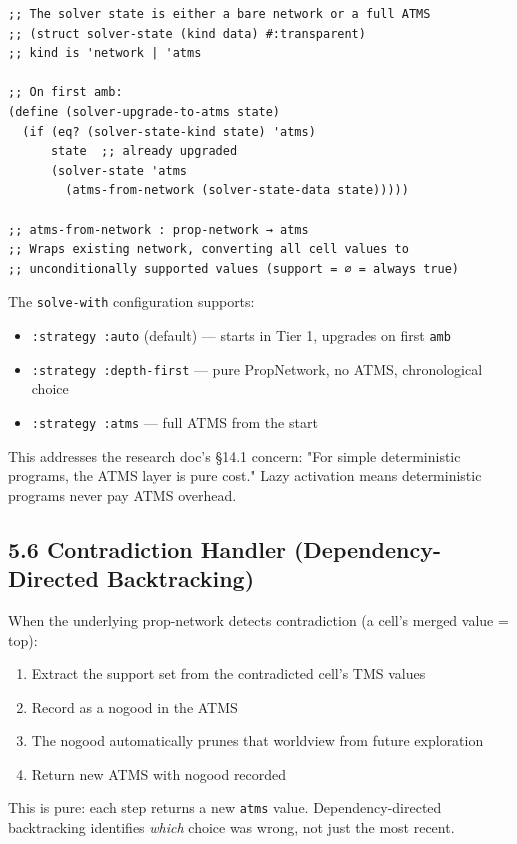 \documentclass[11pt]{article}
\begin{document}
\begin{verbatim}
;; The solver state is either a bare network or a full ATMS
;; (struct solver-state (kind data) #:transparent)
;; kind is 'network | 'atms

;; On first amb:
(define (solver-upgrade-to-atms state)
  (if (eq? (solver-state-kind state) 'atms)
      state  ;; already upgraded
      (solver-state 'atms
        (atms-from-network (solver-state-data state)))))

;; atms-from-network : prop-network → atms
;; Wraps existing network, converting all cell values to
;; unconditionally supported values (support = ∅ = always true)
\end{verbatim}

The \texttt{solve-with} configuration supports:
\begin{itemize}
\item \texttt{:strategy :auto} (default) — starts in Tier 1, upgrades on first \texttt{amb}
\item \texttt{:strategy :depth-first} — pure PropNetwork, no ATMS, chronological choice
\item \texttt{:strategy :atms} — full ATMS from the start
\end{itemize}

This addresses the research doc's §14.1 concern: "For simple deterministic
programs, the ATMS layer is pure cost." Lazy activation means deterministic
programs never pay ATMS overhead.
\subsection{5.6 Contradiction Handler (Dependency-Directed Backtracking)}
\label{sec:org30a5de0}

When the underlying prop-network detects contradiction (a cell's merged
value = top):

\begin{enumerate}
\item Extract the support set from the contradicted cell's TMS values
\item Record as a nogood in the ATMS
\item The nogood automatically prunes that worldview from future exploration
\item Return new ATMS with nogood recorded
\end{enumerate}

This is pure: each step returns a new \texttt{atms} value. Dependency-directed
backtracking identifies \emph{which} choice was wrong, not just the most recent.
\end{document}
